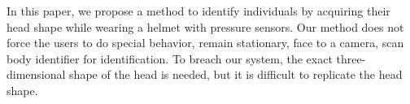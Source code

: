 \documentclass[sigchi,authordraft]{acmart}
\begin{document}


In this paper, we propose a method to identify individuals by acquiring their head shape while wearing a helmet with pressure sensors. Our method does not force the users to do special behavior, remain stationary, face to a camera, scan body identifier for identification. %
To breach our system, the exact three-dimensional shape of the head is needed, but it is difficult to replicate the head shape.
\end{document}
